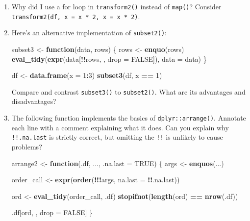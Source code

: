 \documentclass[]{book}
\newenvironment{Shaded}{\begin{snugshade}}{\end{snugshade}}
\newcommand{\ControlFlowTok}[1]{\textcolor[rgb]{0.27,0.27,0.27}{\textbf{#1}}}
\newcommand{\DataTypeTok}[1]{\textcolor[rgb]{0.27,0.27,0.27}{#1}}
\newcommand{\DecValTok}[1]{\textcolor[rgb]{0.06,0.06,0.06}{#1}}
\newcommand{\KeywordTok}[1]{\textcolor[rgb]{0.27,0.27,0.27}{\textbf{#1}}}
\newcommand{\NormalTok}[1]{#1}
\newcommand{\OperatorTok}[1]{\textcolor[rgb]{0.43,0.43,0.43}{\textbf{#1}}}
\newcommand{\OtherTok}[1]{\textcolor[rgb]{0.37,0.37,0.37}{#1}}
\newcommand{\StringTok}[1]{\textcolor[rgb]{0.5,0.5,0.5}{#1}}
\begin{document}
\begin{enumerate}
\def\labelenumi{\arabic{enumi}.}
\item
  Why did I use a for loop in \texttt{transform2()} instead of \texttt{map()}?
  Consider \texttt{transform2(df,\ x\ =\ x\ *\ 2,\ x\ =\ x\ *\ 2)}.
\item
  Here's an alternative implementation of \texttt{subset2()}:

\begin{Shaded}
\begin{Highlighting}[]
\NormalTok{subset3 <-}\StringTok{ }\ControlFlowTok{function}\NormalTok{(data, rows) \{}
\NormalTok{  rows <-}\StringTok{ }\KeywordTok{enquo}\NormalTok{(rows)}
  \KeywordTok{eval_tidy}\NormalTok{(}\KeywordTok{expr}\NormalTok{(data[}\OperatorTok{!!}\NormalTok{rows, , }\DataTypeTok{drop =} \OtherTok{FALSE}\NormalTok{]), }\DataTypeTok{data =}\NormalTok{ data)}
\NormalTok{\}}

\NormalTok{df <-}\StringTok{ }\KeywordTok{data.frame}\NormalTok{(}\DataTypeTok{x =} \DecValTok{1}\OperatorTok{:}\DecValTok{3}\NormalTok{)}
\KeywordTok{subset3}\NormalTok{(df, x }\OperatorTok{==}\StringTok{ }\DecValTok{1}\NormalTok{)}
\end{Highlighting}
\end{Shaded}

  Compare and contrast \texttt{subset3()} to \texttt{subset2()}. What are its advantages
  and disadvantages?
\item
  The following function implements the basics of \texttt{dplyr::arrange()}.
  Annotate each line with a comment explaining what it does. Can you
  explain why \texttt{!!.na.last} is strictly correct, but omitting the \texttt{!!}
  is unlikely to cause problems?

\begin{Shaded}
\begin{Highlighting}[]
\NormalTok{arrange2 <-}\StringTok{ }\ControlFlowTok{function}\NormalTok{(.df, ..., }\DataTypeTok{.na.last =} \OtherTok{TRUE}\NormalTok{) \{}
\NormalTok{  args <-}\StringTok{ }\KeywordTok{enquos}\NormalTok{(...)}

\NormalTok{  order_call <-}\StringTok{ }\KeywordTok{expr}\NormalTok{(}\KeywordTok{order}\NormalTok{(}\OperatorTok{!!!}\NormalTok{args, }\DataTypeTok{na.last =} \OperatorTok{!!}\NormalTok{.na.last))}

\NormalTok{  ord <-}\StringTok{ }\KeywordTok{eval_tidy}\NormalTok{(order_call, .df)}
  \KeywordTok{stopifnot}\NormalTok{(}\KeywordTok{length}\NormalTok{(ord) }\OperatorTok{==}\StringTok{ }\KeywordTok{nrow}\NormalTok{(.df))}

\NormalTok{  .df[ord, , drop =}\StringTok{ }\OtherTok{FALSE}\NormalTok{]}
\NormalTok{\}}
\end{Highlighting}
\end{Shaded}
\end{enumerate}
\end{document}
